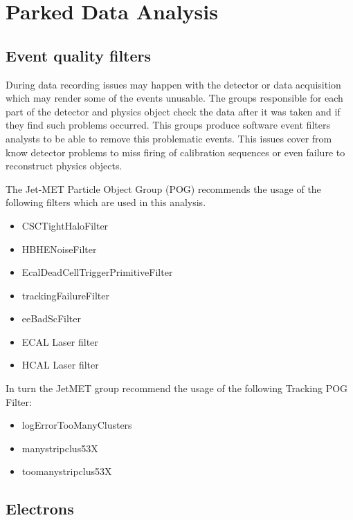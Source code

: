 \chapter{Parked Data Analysis}



\section{Event quality filters}

During data recording issues may happen with the detector or data acquisition which may render some of the events unusable. The groups responsible for each part of the detector and physics object check the data after it was taken and if they find such problems occurred. This groups produce software event filters analysts to be able to remove this problematic events. This issues cover from know detector problems to miss firing of calibration sequences or even failure to reconstruct physics objects.

The Jet-MET Particle Object Group (POG) recommends the usage of the following filters which are used in this analysis.

\begin{itemize}
  \item CSCTightHaloFilter
  \item HBHENoiseFilter
  \item EcalDeadCellTriggerPrimitiveFilter
  \item trackingFailureFilter
  \item eeBadScFilter
  \item ECAL Laser filter
  \item HCAL Laser filter
\end{itemize}

In turn the JetMET group recommend the usage of the following Tracking POG Filter\cite{CMS:TrackingPOG:TrackingPOGFilters}:

\begin{itemize}
  \item logErrorTooManyClusters
  \item manystripclus53X
  \item toomanystripclus53X
\end{itemize}

\section{Electrons}

